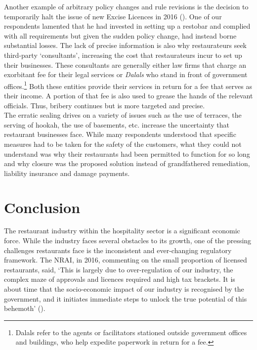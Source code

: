 \documentclass[a4paper, 12pt]{article}
\begin{document}
		Another example of arbitrary policy changes and rule revisions is the decision to temporarily halt the issue of new Excise Licences in 2016 (\cite{toi2016nonewliqlicense}). One of our respondents lamented that he had invested in setting up a restobar and complied with 
all requirements but given the sudden policy change, had instead borne substantial losses. The lack of precise information is also why restaurateurs seek third-party ‘consultants’, increasing the cost that restaurateurs incur to set up their businesses. These 
consultants are generally either law firms that charge an exorbitant fee for their legal services or \textit{Dalals} who stand in front of government offices.\footnote{Dalals refer to the agents or facilitators stationed outside government offices and buildings, who help 
expedite paperwork in return for a fee.} Both these entities provide their services in return for a fee that serves as their income. A portion of that fee is also used to grease the hands of the relevant officials. Thus, bribery continues but is more targeted and precise.\\
		
		The erratic sealing drives on a variety of issues such as the use of terraces, the serving of hookah, the use of basements, etc. increase the uncertainty that restaurant businesses face. While many respondents understood that specific measures had to 
be taken for the safety of the customers, what they could not understand was why their restaurants had been permitted to function for so long and why closure was the proposed solution instead of grandfathered remediation, liability insurance and damage 
payments.



		\section*{Conclusion}
		\label{end}
		
		The restaurant industry within the hospitality sector is a significant economic force. While the industry faces several obstacles to its growth, one of the pressing challenges restaurants face is the inconsistent and ever-changing regulatory framework. The 
NRAI, in 2016, commenting on the small proportion of licensed restaurants, said, ‘This is largely due to over-regulation of our industry, the complex maze of approvals and licences required and high tax brackets. It is about time that the socio-economic impact of 
our industry is recognised by the government, and it initiates immediate steps to unlock the true potential of this behemoth’ (\cite{nrai1}).\\
		
\end{document}

